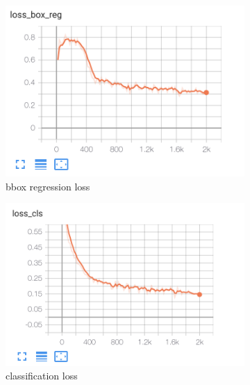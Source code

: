\documentclass[conference]{IEEEtran}
\begin{document}
\begin{figure}[h!]
\centering
\begin{subfigure}[h!]{0.24\textwidth}
    \centering
    \includegraphics[width=\textwidth]{img/loss_bbox_reg.png}
    \caption{bbox regression loss}
    \label{fig:loss_bbox}
\end{subfigure}
\hfill
\begin{subfigure}[h!]{0.24\textwidth}
    \centering
    \includegraphics[width=\textwidth]{img/loss_cls.png}
    \caption{classification loss}
    \label{fig:loss_cls}
\end{subfigure}
\hfill
\begin{subfigure}[h!]{0.24\textwidth}
    \centering

\end{subfigure}
\end{figure}
\end{document}

